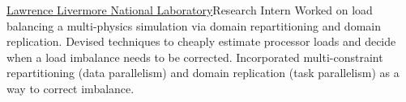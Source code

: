 		{\href{http://www.llnl.gov}{Lawrence Livermore National Laboratory}}{Research Intern}{}{}
		{Worked on load balancing a multi-physics simulation via domain repartitioning
		and domain replication.  Devised techniques to cheaply estimate processor loads and decide
		when a load imbalance needs to be corrected.  Incorporated multi-constraint
		repartitioning (data parallelism) and domain replication (task parallelism)
		as a way to correct imbalance.
		}

